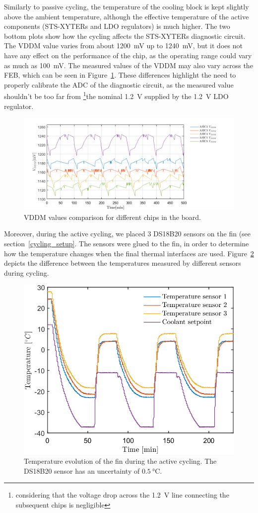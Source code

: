 Similarly to passive cycling, the temperature of the cooling block is kept slightly above the ambient temperature, although the effective temperature of the active components (STS-XYTERs and \gls{LDO} regulators) is much higher. The two bottom plots show how the cycling affects the STS-XYTERs diagnostic circuit. The VDDM value varies from about 1200~mV up to 1240~mV, but it does not have any effect on the performance of the chip, as the operating range could vary as much as 100~mV. The measured values of the VDDM may also vary across the \gls{FEB}, which can be seen in Figure~\ref{feb_vary}. These differences highlight the need to properly calibrate the ADC of the diagnostic circuit, as the measured value shouldn't be too far from \footnote{considering that the voltage drop across the 1.2~V line connecting the subsequent chips is negligible}{the nominal 1.2~V} supplied by the 1.2~V \gls{LDO} regulator. 
\begin{figure}[!h]
\centering
\includegraphics[width=0.9\columnwidth]{Chapter4/images/vddm_comp.png}
\caption{VDDM values comparison for different chips in the board.}
\label{feb_vary}
\end{figure}

Moreover, during the active cycling, we placed 3 DS18B20 sensors on the fin (see section~\ref{cycling_setup}. The sensors were glued to the fin, in order to determine how the temperature changes when the final thermal interfaces are used. Figure~\ref{fig_active_sensors} depicts the difference between the temperatures measured by different sensors during cycling. 

\begin{figure}[!h]
\centering
\includegraphics[width=0.5\columnwidth]{Chapter4/images/active.png}
\caption{Temperature evolution of the fin during the active cycling. The DS18B20 \cite{DS18B20} sensor has an uncertainty of $\SI{0.5}{\celsius}$.}
\label{fig_active_sensors}
\end{figure}



